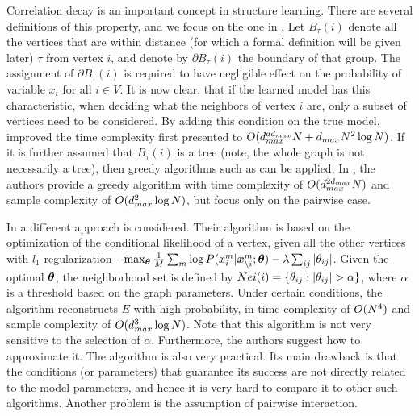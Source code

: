 Correlation decay is an important concept in structure learning.
There are several definitions of this property, and we focus on the one in \cite{montanari2009graphical}.
Let $B_{\tau}(i)$ denote all the vertices that are within distance (for which a formal definition will be given later) $\tau$ from vertex $i$, and denote by $\partial B_{\tau}(i)$ the boundary of that group.
The assignment of $\partial B_{\tau}(i)$ is required to have negligible effect on the probability of variable $x_i$ for all $i \in V$.
It is now clear, that if the learned model has this characteristic, when deciding what the neighbors of vertex $i$ are, only a subset of vertices need to be considered.
By adding this condition on the true model, \cite{bresler2008reconstruction} improved the time complexity first presented to $O(d_{max}^{ad_{max}}N+d_{max}N^2\log N)$.
If it is further assumed that $B_{\tau}(i)$ is a tree (note, the whole graph is not necessarily a tree), then greedy algorithms such as \cite{netrapalli2010greedy, anandkumar2013learning} can be applied.
In \cite{anandkumar2013learning}, the authors provide a greedy algorithm with time complexity of $O(d_{max}^{2d_{max}}{N})$ and sample complexity of $O(d_{max}^2\log N)$, but focus only on the pairwise case.  

In \cite{ravikumar2010high} a different approach is considered. Their algorithm is based on the optimization of the conditional likelihood of a vertex, given all the other vertices with $l_1$ regularization - $\max_{\boldsymbol{\theta}} \frac{1}{M}\sum_m \log P(x^{m}_i| \boldsymbol{x}^m_{\setminus i};\boldsymbol{\theta}) - \lambda \sum_{ij} |\theta_{ij}|$.
Given the optimal $\boldsymbol{\theta}$, the neighborhood set is defined by $Nei(i) = \{\theta_{ij} : |\theta_{ij}| > \alpha\}$, where $\alpha$ is a threshold based on the graph parameters.
Under certain conditions, the algorithm reconstructs $E$ with high probability, in time complexity of $O({N}^4)$ and sample complexity of $O( d_{max}^3 \log {N})$.
Note that this algorithm is not very sensitive to the selection of $\alpha$.
Furthermore, the authors suggest how to approximate it.
The algorithm is also very practical.
Its main drawback is that the conditions (or parameters) that guarantee its success are not directly related to the model parameters, and hence it is very hard to compare it to other such algorithms. Another problem is the assumption of pairwise interaction.     

